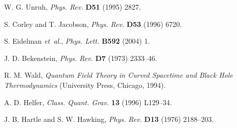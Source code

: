 \documentclass[11pt]{article}
\begin{document}
\begin{thebibliography}{99}
W. G. Unruh, {\em Phys. Rev.} {\bf D51} (1995) 2827.

S. Corley and T. Jacobson, {\em Phys. Rev.} {\bf D53} 
(1996) 6720.


S. Eidelman {\em et~al.}, 
{\em Phys. Lett.} {\bf B592} (2004) 1.

J. D. Bekenstein, {\em Phys. Rev.} {\bf D7} (1973)
2333--46.








R. M. Wald, {\em Quantum Field Theory in Curved
Spacetime and Black Hole Thermodynamics} 
(University Press, Chicago, 1994).


A. D. Helfer, {\em Class. Quant. Grav.} {\bf 13}
(1996) L129--34.

J. B. Hartle and S. W. Hawking, {\em Phys. Rev.} {\bf D13} (1976)
2188--203.


\end{thebibliography}
\end{document}
